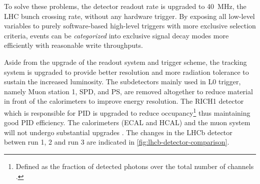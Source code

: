 To solve these problems, the detector readout rate is upgraded to 40~MHz,
the LHC bunch crossing rate,
without any hardware trigger.
By exposing all low-level variables to purely software-based high-level
triggers with more exclusive selection criteria,
events can be \emph{categorized} into exclusive signal decay modes more
efficiently with reasonable write throughputs.

Aside from the upgrade of the readout system and trigger scheme,
the tracking system is upgraded to provide better resolution and more
radiation tolerance to sustain the increased luminosity.
The subdetectors mainly used in L0 trigger, namely Muon station 1, SPD, and PS,
are removed altogether to reduce material in front of the calorimeters to
improve energy resolution.
The RICH1 detector which is responsible for PID is upgraded to reduce
occupancy\footnote{
    Defined as the fraction of detected photons over the total number of
    channels
    \cite{D_Ambrosio_2017}.
}
thus maintaining good PID efficiency.
The calorimeters (ECAL and HCAL) and the muon system will not undergo
substantial upgrades
\cite{Piucci_2017}.
The changes in the LHCb detector betwen run 1, 2 and run 3 are indicated
in \cref{fig:lhcb-detector-comparison}.


